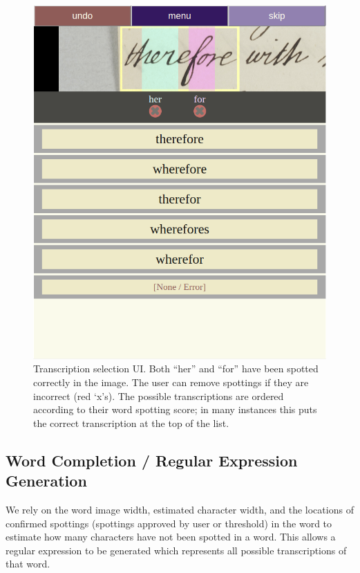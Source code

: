 \documentclass[ms,electronic,twosidetoc,letterpaper,chaptercenter,parttop,lof,lot]{byumsphd}
\begin{document}
\begin{figure}
    \centering
    \includegraphics[width=.75\textwidth]{transcriptionselection}
    \caption{Transcription selection UI.  Both ``her'' and ``for'' have been spotted correctly in the image. The user can remove spottings if they are incorrect (red `x's). The possible transcriptions are ordered according to their word spotting score; in many instances this puts the correct transcription at the top of the list.
    }
    \label{fig:transcriptionselection}
\end{figure}




\subsection{Word Completion / Regular Expression Generation}\label{wordcompletion}
We rely on the word image width, estimated character width, and the locations of confirmed spottings (spottings approved by user or threshold) in the word to estimate how many characters have not been spotted in a word. This allows a regular expression to be generated which represents all possible transcriptions of that word.
\end{document}
